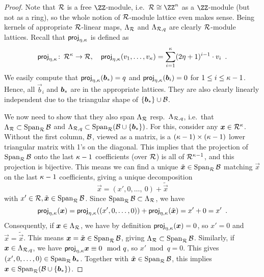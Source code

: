 \begin{proof}
Note that $\mathcal{R}$ is a free $\ZZ$-module, i.e.\ $\ring\cong\ZZ^n$ as a $\ZZ$-module (but not as a ring), so the whole notion of $\mathcal{R}$-module lattice even makes sense.
Being kernels of appropriate $\mathcal{R}$-linear maps, $\Lambda_{\mathcal{R}}$ and $\Lambda_{\mathcal{R},q}$ are clearly $\mathcal{R}$-module lattices. Recall that $\mathsf{proj}_{\eta,\kappa}$ is defined as
\[
\mathsf{proj}_{\eta,\kappa}\colon\,\mathcal{R}^\kappa\to\mathcal{R}, \quad \mathsf{proj}_{\eta,\kappa}(v_1,\ldots, v_{\kappa}) = \sum_{i=1}^{\kappa} (2\eta+1)^{i-1} \cdot v_i\enspace.
\]
We easily compute that $\mathsf{proj}_{\eta,\kappa}(\boldsymbol{b}_{\ast}) = q$ and $\mathsf{proj}_{\eta,\kappa}(\boldsymbol{b}_i) = 0$ for $1\leq i \leq \kappa-1$.
Hence, all $\vec{b}_i$ and $\boldsymbol{b}_{\ast}$ are in the appropriate lattices.
They are also clearly linearly independent due to the triangular shape of $\{\boldsymbol{b}_{\ast}\}\cup\mathcal{B}$.

\smallskip
We now need to show that they also span $\Lambda_{\mathcal{R}}$ resp.\ $\Lambda_{\mathcal{R},q}$, i.e.\ that $\Lambda_{\mathcal{R}} \subset \operatorname*{Span}_{\mathcal{R}}\mathcal{B}$ and $\Lambda_{\mathcal{R},q}\subset\operatorname*{Span}_{\mathcal{R}}(\mathcal{B}\cup\{\boldsymbol{b}_{\ast}\})$.
For this, consider any $\boldsymbol{x}\in\mathcal{R}^\kappa$.
Without the first column, $\mathcal{B}$, viewed as a matrix, is a $(\kappa-1)\times (\kappa-1)$ lower triangular matrix with 1's on the diagonal.
This implies that the projection of $\operatorname*{Span}_{\mathcal{R}}\mathcal{B}$ onto the last $\kappa-1$ coefficients (over $\mathcal{R}$) is all of $\mathcal{R}^{\kappa-1}$, and this projection is bijective.
This means we can find a unique $\tilde{\boldsymbol{x}}\in\operatorname*{Span}_{\mathcal{R}}\mathcal{B}$ matching $\vec{x}$ on the last $\kappa-1$ coefficients, giving a unique decomposition
\[
 \vec{x} = (x',0,\ldots,\ 0) + \tilde{\vec{x}}
\]
with $x'\in\mathcal{R}, \tilde{\boldsymbol{x}}\in\operatorname*{Span}_{\mathcal{R}}\mathcal{B}$. Since $\operatorname*{Span}_{\mathcal{R}}\mathcal{B}\subset \Lambda_{\mathcal{R}}$, we have
\[
 \mathsf{proj}_{\eta,\kappa}(\boldsymbol{x}) = \mathsf{proj}_{\eta,\kappa}((x',0,\ldots,0)) + \mathsf{proj}_{\eta,\kappa}(\tilde{\boldsymbol{x}}) = x' + 0 = x'\enspace.
\]
Consequently, if $\boldsymbol{x}\in\Lambda_{\mathcal{R}}$, we have by definition $\mathsf{proj}_{\eta,\kappa}(\boldsymbol{x}) = 0$, so $x'=0$ and $\vec{x} = \tilde{\vec{x}}$. This means $\boldsymbol{x} = \tilde{\boldsymbol{x}}\in\operatorname*{Span}_{\mathcal{R}}\mathcal{B}$, giving $\Lambda_{\mathcal{R}} \subset \operatorname*{Span}_{\mathcal{R}}\mathcal{B}$.
Similarly, if $\boldsymbol{x}\in\Lambda_{\mathcal{R},q}$, we have $\mathsf{proj}_{\eta,\kappa}{\boldsymbol{x}}\equiv 0 \mod q$, so $x'\bmod q = 0$. This gives $(x',0,\ldots, 0)\in\operatorname*{Span}_{\mathcal{R}}\boldsymbol{b}_{\ast}$. Together with $\tilde{\boldsymbol{x}}\in\operatorname*{Span}_{\mathcal{R}}\mathcal{B}$, this implies $\boldsymbol{x}\in\operatorname*{Span}_{\mathcal{R}}(\mathcal{B}\cup\{\boldsymbol{b}_{\ast}\})$.


\end{proof}
